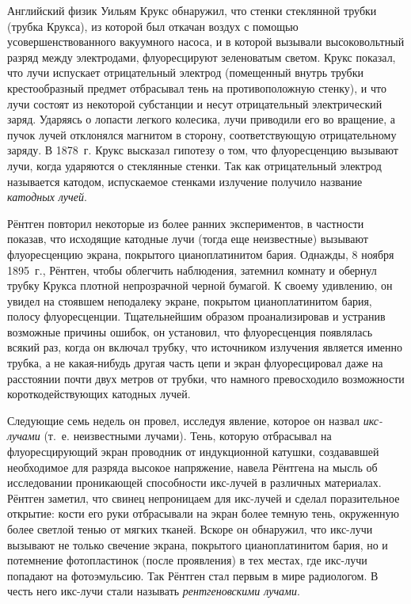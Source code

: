 \documentclass[a4paper,14pt, openany, twoside, draft]{extbook} %
\begin{document}
Английский физик Уильям Крукс обнаружил, что стенки стеклянной трубки (трубка Крукса), из которой был откачан воздух с помощью усовершенствованного вакуумного насоса, и в которой вызывали высоковольтный разряд между электродами, флуоресцируют зеленоватым светом.  Крукс показал, что лучи испускает отрицательный электрод (помещенный внутрь трубки крестообразный предмет отбрасывал тень на противоположную стенку), и что лучи состоят из некоторой субстанции и несут отрицательный электрический заряд.  Ударяясь о лопасти легкого колесика, лучи приводили его во вращение, а пучок лучей отклонялся магнитом в сторону, соответствующую отрицательному заряду.  В 1878~г. Крукс высказал гипотезу о том, что флуоресценцию вызывают лучи, когда ударяются о стеклянные стенки.  Так как отрицательный электрод называется катодом, испускаемое стенками излучение получило название \emph{катодных лучей}.

Рёнтген повторил некоторые из более ранних экспериментов, в частности показав, что исходящие катодные лучи (тогда еще неизвестные) вызывают флуоресценцию экрана, покрытого цианоплатинитом бария.  Однажды, 8 ноября 1895~г., Рёнтген, чтобы облегчить наблюдения, затемнил комнату и обернул трубку Крукса плотной непрозрачной черной бумагой.  К своему удивлению, он увидел на стоявшем неподалеку экране, покрытом цианоплатинитом бария, полосу флуоресценции.  Тщательнейшим образом проанализировав и устранив возможные причины ошибок, он установил, что флуоресценция появлялась всякий раз, когда он включал трубку, что источником излучения является именно трубка, а не какая-нибудь другая часть цепи и экран флуоресцировал даже на расстоянии почти двух метров от трубки, что намного превосходило возможности короткодействующих катодных лучей.

Следующие семь недель он провел, исследуя явление, которое он назвал \emph{икс-лучами} (т.~е. неизвестными лучами).  Тень, которую отбрасывал на флуоресцирующий экран проводник от индукционной катушки, создававшей необходимое для разряда высокое напряжение, навела Рёнтгена на мысль об исследовании проникающей способности икс-лучей в различных материалах.  Рёнтген заметил, что свинец непроницаем для икс-лучей и сделал поразительное открытие: кости его руки отбрасывали на экран более темную тень, окруженную более светлой тенью от мягких тканей.  Вскоре он обнаружил, что икс-лучи вызывают не только свечение экрана, покрытого цианоплатинитом бария, но и потемнение фотопластинок (после проявления) в тех местах, где икс-лучи попадают на фотоэмульсию.  Так Рёнтген стал первым в мире радиологом.  В честь него икс-лучи стали называть \emph{рентгеновскими лучами}.
\end{document}
